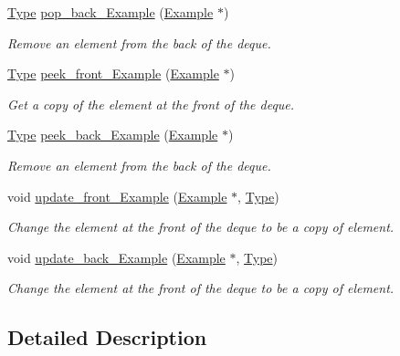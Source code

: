 \begin{DoxyCompactItemize}
\hyperlink{group__DEQUE_gac9c83c2070eb6b5891cf742b90f54c68}{Type} \hyperlink{group__DEQUE_gaa3a49a1ed1aac021037fe94820ed8c95}{pop\+\_\+back\+\_\+\+Example} (\hyperlink{structExample}{Example} $\ast$)
\begin{DoxyCompactList}\small\item\em Remove an element from the back of the deque. \end{DoxyCompactList}\item 
\hyperlink{group__DEQUE_gac9c83c2070eb6b5891cf742b90f54c68}{Type} \hyperlink{group__DEQUE_gab65f67206d60592e7a12d4ed1c833cc1}{peek\+\_\+front\+\_\+\+Example} (\hyperlink{structExample}{Example} $\ast$)
\begin{DoxyCompactList}\small\item\em Get a copy of the element at the front of the deque. \end{DoxyCompactList}\item 
\hyperlink{group__DEQUE_gac9c83c2070eb6b5891cf742b90f54c68}{Type} \hyperlink{group__DEQUE_ga17ee221f1873599af8849e47af1d490c}{peek\+\_\+back\+\_\+\+Example} (\hyperlink{structExample}{Example} $\ast$)
\begin{DoxyCompactList}\small\item\em Remove an element from the back of the deque. \end{DoxyCompactList}\item 
void \hyperlink{group__DEQUE_ga2f5457e6575eb38d59b7504770ca247e}{update\+\_\+front\+\_\+\+Example} (\hyperlink{structExample}{Example} $\ast$, \hyperlink{group__DEQUE_gac9c83c2070eb6b5891cf742b90f54c68}{Type})
\begin{DoxyCompactList}\small\item\em Change the element at the front of the deque to be a copy of element. \end{DoxyCompactList}\item 
void \hyperlink{group__DEQUE_ga0705ac52e0952213b9f1ce7f80bf977e}{update\+\_\+back\+\_\+\+Example} (\hyperlink{structExample}{Example} $\ast$, \hyperlink{group__DEQUE_gac9c83c2070eb6b5891cf742b90f54c68}{Type})
\begin{DoxyCompactList}\small\item\em Change the element at the front of the deque to be a copy of element. \end{DoxyCompactList}\end{DoxyCompactItemize}


\subsection{Detailed Description}


